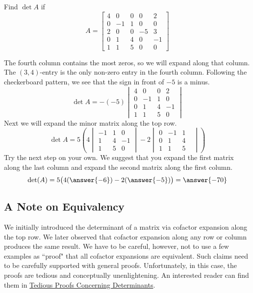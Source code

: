 \documentclass{ximera}
\begin{document}
\begin{example}\label{ex:laplace2}
Find $\det{A}$ if
$$A=\begin{bmatrix}4&0&0&0&2\\0&-1&1&0&0\\2&0&0&-5&3\\0&1&4&0&-1\\1&1&5&0&0\end{bmatrix}$$

\begin{explanation}
The fourth column contains the most zeros, so we will expand along that column.  The  $(3, 4)$-entry is the only non-zero entry in the fourth column.  Following the checkerboard pattern, we see that the sign in front of $-5$ is a minus.  
$$\det{A}=-(-5)\begin{vmatrix}4&0&0&2\\0&-1&1&0\\0&1&4&-1\\1&1&5&0\end{vmatrix}
$$
Next we will expand the minor matrix along the top row.
$$\det{A}=5\left(4\begin{vmatrix}-1&1&0\\1&4&-1\\1&5&0\end{vmatrix}-2\begin{vmatrix}0&-1&1\\0&1&4&\\1&1&5\end{vmatrix}\right)$$
Try the next step on your own.  We suggest that you expand the first matrix along the last column and expand the second matrix along the first column.
$$\det(A)=5\big(4(\answer{-6})-2(\answer{-5})\big)=\answer{-70}$$
\end{explanation}
\end{example}

\subsection*{A Note on Equivalency}
We initially introduced the determinant of a matrix via cofactor expansion along the top row.  We later observed that cofactor expansion along any row or column produces the same result.  We have to be careful, however, not to use a few examples as ``proof" that all cofactor expansions are equivalent.  Such claims need to be carefully supported with general proofs.  Unfortunately, in this case, the proofs are tedious and conceptually unenlightening.  An interested reader can find them in \href{https://ximera.osu.edu/oerlinalg/LinearAlgebra/DET-0050/main}{Tedious Proofs Concerning Determinants}.
\end{document}
